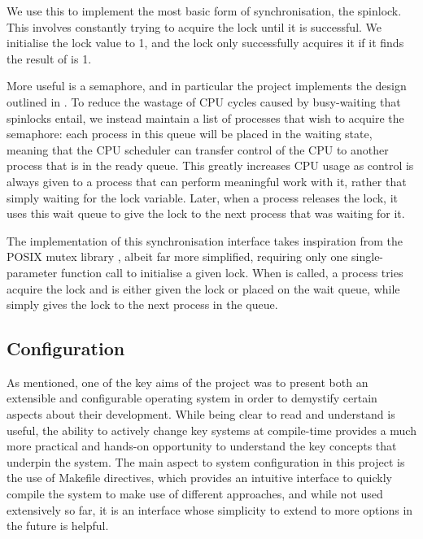     We use this to implement the most basic form of synchronisation, the
    spinlock. This involves constantly trying to acquire the lock until it is
    successful. We initialise the lock value to 1, and the lock only
    successfully acquires it if it finds the result of  is 1.

    More useful is a semaphore, and in particular the project implements the
    design outlined in \cite[pg.~265]{DinosaurOS}. To reduce the wastage of CPU
    cycles caused by busy-waiting that spinlocks entail, we instead maintain a
    list of processes that wish to acquire the semaphore: each process in this
    queue will be placed in the waiting state, meaning that the CPU scheduler
    can transfer control of the CPU to another process that is in the ready
    queue. This greatly increases CPU usage as control is always given to a
    process that can perform meaningful work with it, rather that simply waiting
    for the lock variable. Later, when a process releases the lock, it uses this
    wait queue to give the lock to the next process that was waiting for it.

    The implementation of this synchronisation interface takes inspiration from
    the POSIX mutex library \cite{POSIX_mutex}, albeit far more simplified,
    requiring only one single-parameter function call to initialise a given
    lock. When  is called, a process tries acquire the lock
    and is either given the lock or placed on the wait queue, while
     simply gives the lock to the next process in the
    queue.

\subsection{Configuration}
    \label{sec:Configuration}
    As mentioned, one of the key aims of the project was to present both an
    extensible and configurable operating system in order to demystify certain
    aspects about their development. While being clear to read and understand is
    useful, the ability to actively change key systems at compile-time provides
    a much more practical and hands-on opportunity to understand the key
    concepts that underpin the system. The main aspect to system configuration
    in this project is the use of Makefile directives, which provides an
    intuitive interface to quickly compile the system to make use of different
    approaches, and while not used extensively so far, it is an interface whose
    simplicity to extend to more options in the future is helpful.

